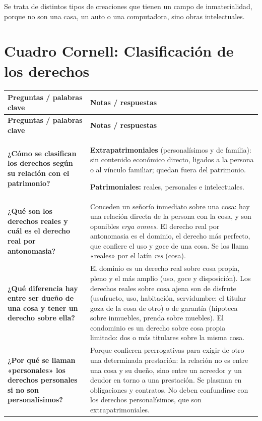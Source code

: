 \documentclass[12pt,oneside]{book}
\newcommand{\cornellinicio}{\begingroup\small\renewcommand{\arraystretch}{1.4}}
\newcommand{\cornellpregunta}[2]{\textbf{#1} & #2 \\ \hline}
\begin{document}
Se trata de distintos tipos de creaciones que tienen un campo de inmaterialidad, porque no son una casa, un auto o una computadora, sino obras intelectuales.

\section{Cuadro Cornell: Clasificación de los derechos}

\cornellinicio
\begin{longtable}{|Q|Z|}
\hline
{}\textbf{Preguntas / palabras clave} & \textbf{Notas / respuestas} \\ \hline
\endfirsthead
\hline
{}\textbf{Preguntas / palabras clave} & \textbf{Notas / respuestas} \\ \hline
\endhead

\cornellpregunta{¿Cómo se clasifican los derechos según su relación con el patrimonio?}{%
\textbf{Extrapatrimoniales} (personalísimos y de familia): sin contenido económico directo, ligados a la persona o al vínculo familiar; quedan fuera del patrimonio.

\textbf{Patrimoniales:} reales, personales e intelectuales.}

\cornellpregunta{¿Qué son los derechos reales y cuál es el derecho real por antonomasia?}{%
Conceden un señorío inmediato sobre una cosa: hay una relación directa de la persona con la cosa, y son oponibles \textit{erga omnes}. El derecho real por antonomasia es el dominio, el derecho más perfecto, que confiere el uso y goce de una cosa. Se los llama «reales» por el latín \textit{res} (cosa).}

\cornellpregunta{¿Qué diferencia hay entre ser dueño de una cosa y tener un derecho sobre ella?}{%
El dominio es un derecho real sobre cosa propia, pleno y el más amplio (uso, goce y disposición). Los derechos reales sobre cosa ajena son de disfrute (usufructo, uso, habitación, servidumbre: el titular goza de la cosa de otro) o de garantía (hipoteca sobre inmuebles, prenda sobre muebles). El condominio es un derecho sobre cosa propia limitado: dos o más titulares sobre la misma cosa.}

\cornellpregunta{¿Por qué se llaman «personales» los derechos personales si no son personalísimos?}{%
Porque confieren prerrogativas para exigir de otro una determinada prestación: la relación no es entre una cosa y su dueño, sino entre un acreedor y un deudor en torno a una prestación. Se plasman en obligaciones y contratos. No deben confundirse con los derechos personalísimos, que son extrapatrimoniales.}


\end{longtable}
\end{document}
